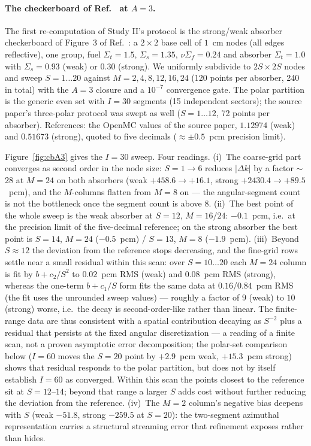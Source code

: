 \paragraph{The checkerboard of Ref.~\cite{psn2027} at $A{=}3$.}
The first re-computation of Study II's protocol is the strong/weak
absorber checkerboard of Figure~3 of Ref.~\cite{psn2027}: a $2\times2$
base cell of $1$~cm nodes (all edges reflective), one group, fuel
$\Sigma_t{=}1.5$, $\Sigma_s{=}1.35$, $\nu\Sigma_f{=}0.24$ and absorber
$\Sigma_t{=}1.0$ with $\Sigma_s{=}0.93$ (weak) or $0.30$ (strong). We
uniformly subdivide to $2S\times2S$ nodes and sweep
$S{=}1\ldots20$ against $M{=}2,4,8,12,16,24$ (120 points per
absorber, 240 in total) with the $A{=}3$ closure and a $10^{-7}$ convergence
gate. The
polar partition is the generic even set with $I{=}30$ segments (15
independent sectors); the source paper's three-polar protocol
was swept as well ($S{=}1\ldots12$, 72 points per absorber). References: the OpenMC values of
the source paper, $1.12974$ (weak) and $0.51673$ (strong), quoted to
five decimals ($\approx\pm0.5$~pcm precision limit).

Figure~\ref{fig:cbA3} gives the $I{=}30$ sweep. Four readings.
(i)~The coarse-grid part converges as second order in the node size:
$S{=}1\to6$ reduces $|\Delta k|$ by a factor $\sim$28 at $M{=}24$
on both absorbers (weak $+458.6\to+16.1$, strong
$+2430.4\to+89.5$~pcm), and the $M$-columns flatten from $M{=}8$ on
--- the angular-segment count is not the bottleneck once the segment
count is above 8.
(ii)~The best point of the whole sweep is the weak absorber at
$S{=}12$, $M{=}16/24$: $-0.1$~pcm, i.e.\ at the precision limit of the
five-decimal reference; on the strong absorber the best point is
$S{=}14$, $M{=}24$ ($-0.5$~pcm) / $S{=}13$, $M{=}8$ ($-1.9$~pcm).
(iii)~Beyond $S{\approx}12$ the deviation from the reference stops
decreasing, and the fine-grid rows settle near a small residual within
this scan: over $S{=}10\ldots20$
each $M{=}24$ column is fit by $b+c_2/S^2$ to $0.02$~pcm RMS (weak)
and $0.08$~pcm RMS (strong), whereas the one-term $b+c_1/S$ form fits
the same data at $0.16$/$0.84$~pcm RMS (the fit uses the unrounded
sweep values) --- roughly a factor of $9$
(weak) to $10$ (strong) worse, i.e.\ the decay is second-order-like
rather than linear. The finite-range data are thus consistent with a
spatial contribution decaying as $S^{-2}$ plus a residual that
persists at the fixed angular discretization --- a reading of a finite
scan, not a proven asymptotic error decomposition; the polar-set
comparison below ($I{=}60$ moves the $S{=}20$ point by $+2.9$~pcm
weak, $+15.3$~pcm strong) shows that residual responds to the polar
partition, but does not by itself establish $I{=}60$ as converged.
Within this scan the points closest to the reference sit at
$S{=}12$--$14$; beyond that range a larger $S$ adds cost without
further reducing the deviation from the reference.
(iv)~The $M{=}2$ column's negative bias deepens with $S$ (weak
$-51.8$, strong $-259.5$ at $S{=}20$): the two-segment azimuthal
representation carries a structural streaming error that refinement
exposes rather than hides.

